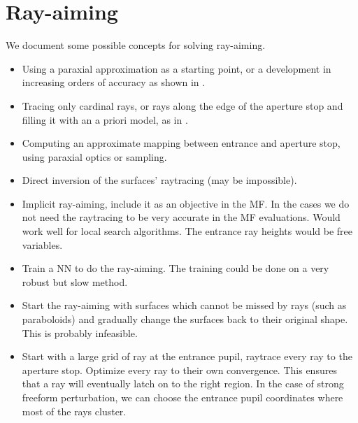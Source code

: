 \section{Ray-aiming}
We document some possible concepts for solving ray-aiming.

\begin{itemize}
\item Using a paraxial approximation as a starting point, or a development
      in increasing orders of accuracy as shown in \cite{Zheng2010}.
\item Tracing only cardinal rays, or rays along the edge of the aperture
      stop and filling it with an a priori model, as in \cite{Houllier-thesis}.
\item Computing an approximate mapping between entrance and aperture stop,
      using paraxial optics or sampling.
\item Direct inversion of the surfaces' raytracing (may be impossible).
\item Implicit ray-aiming, include it as an objective in the MF. In the
      cases we do not need the raytracing to be very accurate in the MF
      evaluations. Would work well for local search algorithms. The
      entrance ray heights would be free variables.
\item Train a NN to do the ray-aiming. The training could be done on
      a very robust but slow method.
\item Start the ray-aiming with surfaces which cannot be missed by rays (such as
      paraboloids) and gradually change the surfaces back to their original shape.
      This is probably infeasible.
\item Start with a large grid of ray at the entrance pupil, raytrace every ray
      to the aperture stop. Optimize every ray to their own convergence.
      This ensures that a ray will eventually latch on to the right region.
      In the case of strong freeform perturbation, we can choose the entrance
      pupil coordinates where most of the rays cluster.
\end{itemize}
